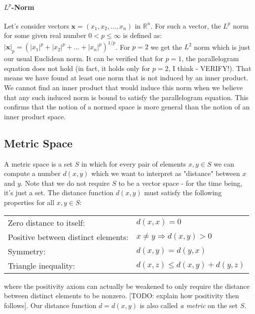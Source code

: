 \paragraph{$L^p$-Norm} Let's consider vectors $\mathbf{x} = (x_1, x_2, \ldots, x_n)$ in $\mathbb{R}^n$. For such a vector, the $L^p$ norm for some given real number $0 < p \leq \infty$ is defined as: $ |\mathbf{x}|_p = (|x_1|^p + |x_2|^p + \ldots + |x_n|^p)^{1/p}$. For $p=2$ we get the $L^2$ norm which is just our usual Euclidean norm. It can be verified that for $p=1$, the parallelogram equation does not hold (in fact, it holds only for $p = 2$, I think - VERIFY!). That means we have found at least one norm that is not induced by an inner product. We cannot find an inner product that would induce this norm when we believe that any such induced norm is bound to satisfy the parallelogram equation. This confirms that the notion of a normed space is more general than the notion of an inner product space.





\subsection{Metric Space}
A metric space is a set $S$ in which for every pair of elements $x,y \in S$ we can compute a number $d(x,y)$ which we want to interpret as "distance" between $x$ and $y$. Note that we do not require $S$ to be a vector space - for the time being, it's just a set. The distance function $d(x,y)$ must satisfy the following properties for all $x,y \in S$:

\medskip
\begin{tabular}{l l}
Zero distance to itself:            & $d(x, x) = 0$  \\
Positive between distinct elements: & $x \neq y \Rightarrow d(x,y) > 0$  \\
Symmetry:                           & $d(x, y) = d(y, x)$  \\
Triangle inequality:                & $d(x,z) \leq d(x,y) + d(y,z)$
\end{tabular}
\medskip
where the positivity axiom can actually be weakened to only require the distance between distinct elements to be nonzero. [TODO: explain how positivity then follows]. Our distance function $d = d(x,y)$ is also called \emph{a metric} on the set $S$. 

